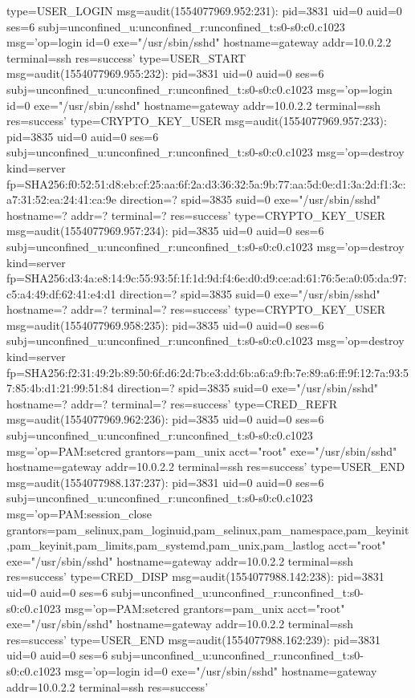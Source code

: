 \documentclass[]{report}
\newenvironment{Shaded}{}{}
\newcommand{\NormalTok}[1]{#1}
\begin{document}
\begin{Shaded}
\begin{Highlighting}[]
\NormalTok{type=USER_LOGIN msg=audit(1554077969.952:231): pid=3831 uid=0 auid=0 ses=6 subj=unconfined_u:unconfined_r:unconfined_t:s0-s0:c0.c1023 msg='op=login id=0 exe="/usr/sbin/sshd" hostname=gateway addr=10.0.2.2 terminal=ssh res=success'}
\NormalTok{type=USER_START msg=audit(1554077969.955:232): pid=3831 uid=0 auid=0 ses=6 subj=unconfined_u:unconfined_r:unconfined_t:s0-s0:c0.c1023 msg='op=login id=0 exe="/usr/sbin/sshd" hostname=gateway addr=10.0.2.2 terminal=ssh res=success'}
\NormalTok{type=CRYPTO_KEY_USER msg=audit(1554077969.957:233): pid=3835 uid=0 auid=0 ses=6 subj=unconfined_u:unconfined_r:unconfined_t:s0-s0:c0.c1023 msg='op=destroy kind=server fp=SHA256:f0:52:51:d8:eb:cf:25:aa:6f:2a:d3:36:32:5a:9b:77:aa:5d:0e:d1:3a:2d:f1:3c:a7:31:52:ea:24:41:ca:9e direction=? spid=3835 suid=0  exe="/usr/sbin/sshd" hostname=? addr=? terminal=? res=success'}
\NormalTok{type=CRYPTO_KEY_USER msg=audit(1554077969.957:234): pid=3835 uid=0 auid=0 ses=6 subj=unconfined_u:unconfined_r:unconfined_t:s0-s0:c0.c1023 msg='op=destroy kind=server fp=SHA256:d3:4a:e8:14:9c:55:93:5f:1f:1d:9d:f4:6e:d0:d9:ce:ad:61:76:5e:a0:05:da:97:c5:a4:49:df:62:41:e4:d1 direction=? spid=3835 suid=0  exe="/usr/sbin/sshd" hostname=? addr=? terminal=? res=success'}
\NormalTok{type=CRYPTO_KEY_USER msg=audit(1554077969.958:235): pid=3835 uid=0 auid=0 ses=6 subj=unconfined_u:unconfined_r:unconfined_t:s0-s0:c0.c1023 msg='op=destroy kind=server fp=SHA256:f2:31:49:2b:89:50:6f:d6:2d:7b:e3:dd:6b:a6:a9:fb:7e:89:a6:ff:9f:12:7a:93:57:85:4b:d1:21:99:51:84 direction=? spid=3835 suid=0  exe="/usr/sbin/sshd" hostname=? addr=? terminal=? res=success'}
\NormalTok{type=CRED_REFR msg=audit(1554077969.962:236): pid=3835 uid=0 auid=0 ses=6 subj=unconfined_u:unconfined_r:unconfined_t:s0-s0:c0.c1023 msg='op=PAM:setcred grantors=pam_unix acct="root" exe="/usr/sbin/sshd" hostname=gateway addr=10.0.2.2 terminal=ssh res=success'}
\NormalTok{type=USER_END msg=audit(1554077988.137:237): pid=3831 uid=0 auid=0 ses=6 subj=unconfined_u:unconfined_r:unconfined_t:s0-s0:c0.c1023 msg='op=PAM:session_close grantors=pam_selinux,pam_loginuid,pam_selinux,pam_namespace,pam_keyinit,pam_keyinit,pam_limits,pam_systemd,pam_unix,pam_lastlog acct="root" exe="/usr/sbin/sshd" hostname=gateway addr=10.0.2.2 terminal=ssh res=success'}
\NormalTok{type=CRED_DISP msg=audit(1554077988.142:238): pid=3831 uid=0 auid=0 ses=6 subj=unconfined_u:unconfined_r:unconfined_t:s0-s0:c0.c1023 msg='op=PAM:setcred grantors=pam_unix acct="root" exe="/usr/sbin/sshd" hostname=gateway addr=10.0.2.2 terminal=ssh res=success'}
\NormalTok{type=USER_END msg=audit(1554077988.162:239): pid=3831 uid=0 auid=0 ses=6 subj=unconfined_u:unconfined_r:unconfined_t:s0-s0:c0.c1023 msg='op=login id=0 exe="/usr/sbin/sshd" hostname=gateway addr=10.0.2.2 terminal=ssh res=success'}

\end{Highlighting}
\end{Shaded}
\end{document}
